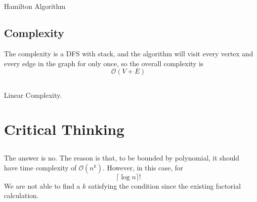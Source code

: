 \documentclass[A4paper]{article}
\begin{document}
\subsection{}
\begin{algorithm}
\caption{Hamilton Algorithm}
\end{algorithm}
\newpage
\begin{flushleft}
\subsection{Complexity}
The complexity is a DFS with stack, and the algorithm will visit every vertex and every edge in the graph for only once, so the overall complexity is 
\[
 	\mathcal{O}(V+E)
 \] 
\end{flushleft}
\subsection{}
Linear Complexity.

\section{Critical Thinking}
\subsection{}
The answer is no. The reason is that, to be bounded by polynomial, it should have time complexity of $\mathcal{O}(n^k)$. However, in this case, for\[
	\lceil \log n \rceil !
\] 
We are not able to find a $k$ satisfying the condition since the existing factorial calculation.
\end{document}
